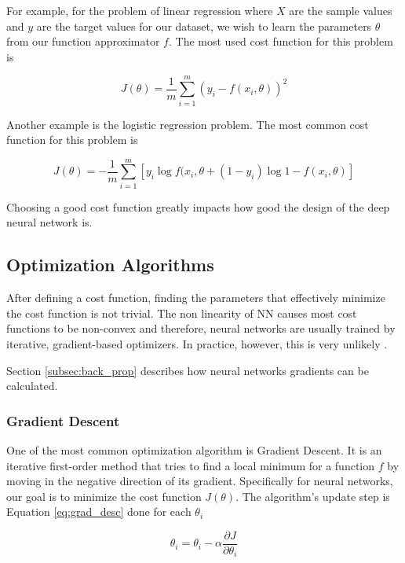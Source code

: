 For example, for the problem of linear regression where $X$ are the sample values and $y$ are the target
values for our dataset, we wish to learn the parameters $\theta$ from our function approximator $f$. 
The most used cost function for this problem is

\begin{equation}
    J(\theta) = \dfrac{1}{m} \sum_{i = 1}^m (y_i - f(x_i, \theta))^2
\end{equation}

Another example is the logistic regression problem. The most common cost function for this problem is

\begin{equation}
    J(\theta) = - \dfrac{1}{m} \sum_{i = 1}^m [y_i\log{f(x_i, \theta} + (1 - y_i)\log{1 - f(x_i, \theta)}]
\end{equation}

Choosing a good cost function greatly impacts how good the design of the deep neural network is.


\subsection{Optimization Algorithms}

After defining a cost function, finding the parameters that effectively minimize the cost function is not trivial.
The non linearity of NN causes most cost functions to be non-convex and therefore, neural networks are usually
trained by iterative, gradient-based optimizers. In practice, however, this is very unlikely
 \cite{swirszcz2017local, goodfellow2014qualitatively, lin2017does}.

Section \ref{subsec:back_prop} describes how neural networks gradients can be calculated.

\subsubsection{Gradient Descent}

One of the most common optimization algorithm is Gradient Descent. It is an iterative first-order method
that tries to find a local minimum for a function $f$ by moving in the negative direction of its gradient.
Specifically for neural networks, our goal is to minimize the cost function $J(\theta)$. The algorithm's update step
is Equation \eqref{eq:grad_desc} done for each $\theta_i$

\begin{equation}
    \theta_i = \theta_i - \alpha \dfrac{\partial J}{\partial \theta_i}
    \label{eq:grad_desc}
\end{equation}

